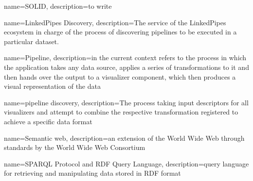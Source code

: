 {
    name={SOLID},
    description={to write}
}
    
{
    name={LinkedPipes Discovery},
    description={The service of the LinkedPipes ecosystem in charge of the process of discovering pipelines to be executed in a particular dataset.}
}

{
    name=Pipeline,
    description={in the current context refers to the process in which the application takes any data source, applies a series of transformations to it and then hands over the output to a visualizer component, which then produces a visual representation of the data}
}

{
    name={pipeline discovery},
    description={The process taking input descriptors for all visualizers and attempt to combine the respective transformation registered to achieve a specific data format}
}

{
    name={Semantic web},
    description={an extension of the World Wide Web through standards by the World Wide Web Consortium}
}

{
    name={SPARQL Protocol and RDF Query Language},
    description={query language for retrieving and manipulating data stored in RDF format}
}
